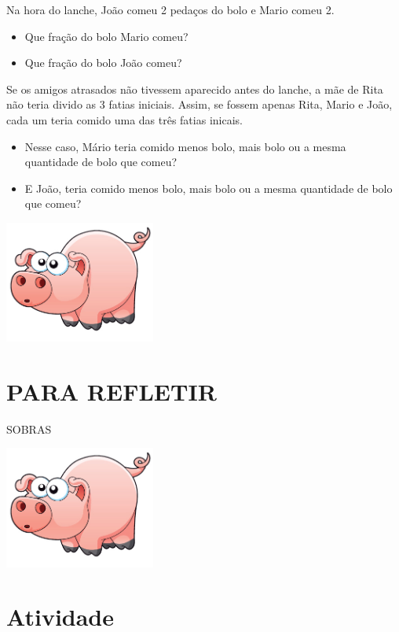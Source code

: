 \documentclass[a4,12pt]{book}
\begin{document}
Na hora do lanche, João comeu 2 pedaços do bolo e Mario comeu 2.
\begin{itemize} %
  \item     Que fração do bolo Mario comeu?
  \item     Que fração do bolo João comeu?
\end{itemize} %

Se os amigos atrasados não tivessem aparecido antes do lanche, a mãe de Rita não teria divido as 3 fatias iniciais. Assim, se fossem apenas Rita, Mario e João, cada um teria comido uma das três fatias inicais.
\begin{itemize} %
  \item     Nesse caso, Mário teria comido menos bolo, mais bolo ou a mesma quantidade de bolo que comeu?
  \item     E João, teria comido menos bolo, mais bolo ou a mesma quantidade de bolo que comeu?
\end{itemize} %






\includegraphics[width=\textwidth,height=4cm, keepaspectratio]{pig}
\section*{ PARA REFLETIR }









SOBRAS

\includegraphics[width=\textwidth,height=4cm, keepaspectratio]{pig}
\section{Atividade}
\end{document}
